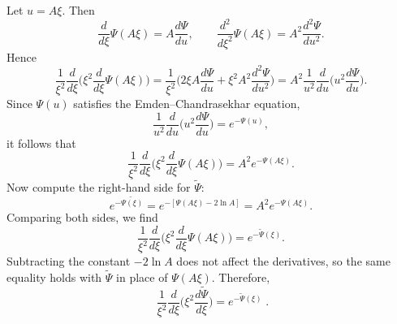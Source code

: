 \documentclass[12pt,a4paper]{article}
\numberwithin{equation}{section}
\begin{document}
Let \(u=A\xi\). Then
\begin{equation}
\frac{d}{d\xi}\Psi(A\xi)=A\frac{d\Psi}{du}, \qquad
\frac{d^2}{d\xi^2}\Psi(A\xi)=A^2\frac{d^2\Psi}{du^2}.
\end{equation}
Hence
\begin{equation}
\frac{1}{\xi^{2}}\frac{d}{d\xi}\!\Big(\xi^{2}\frac{d}{d\xi}\Psi(A\xi)\Big)
= \frac{1}{\xi^{2}}\Big(2\xi A\frac{d\Psi}{du}+\xi^{2}A^2\frac{d^2\Psi}{du^2}\Big)
= A^2\frac{1}{u^{2}}\frac{d}{du}\!\Big(u^{2}\frac{d\Psi}{du}\Big).
\end{equation}
Since \(\Psi(u)\) satisfies the Emden–Chandrasekhar equation,
\begin{equation}
\frac{1}{u^{2}}\frac{d}{du}\!\Big(u^{2}\frac{d\Psi}{du}\Big)=e^{-\Psi(u)},
\end{equation}
it follows that
\begin{equation}
\frac{1}{\xi^{2}}\frac{d}{d\xi}\!\Big(\xi^{2}\frac{d}{d\xi}\Psi(A\xi)\Big)=A^{2}e^{-\Psi(A\xi)}.
\end{equation}
Now compute the right-hand side for \(\widetilde{\Psi}\):
\begin{equation}
e^{-\widetilde{\Psi(\xi)}}=e^{-[\Psi(A\xi)-2\ln A]}=A^{2}e^{-\Psi(A\xi)}.
\end{equation}
Comparing both sides, we find
\begin{equation}
\frac{1}{\xi^{2}}\frac{d}{d\xi}\!\Big(\xi^{2}\frac{d}{d\xi}\Psi(A\xi)\Big)=e^{-\widetilde{\Psi}(\xi)}.
\end{equation}
Subtracting the constant \(-2\ln A\) does not affect the derivatives, so the same equality holds with \(\widetilde{\Psi}\) in place of \(\Psi(A\xi)\). Therefore,
\begin{equation}
\boxed{\;\frac{1}{\xi^{2}}\frac{d}{d\xi}\!\Big(\xi^{2}\frac{d\widetilde{\Psi}}{d\xi}\Big)=e^{-\widetilde{\Psi}(\xi)}\;.}
\end{equation}
\end{document}
